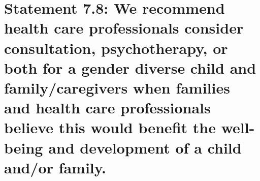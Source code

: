 \documentclass[
]{book}
\begin{document}
\hypertarget{statement-7.8-we-recommend-health-care-professionals-consider-consultation-psychotherapy-or-both-for-a-gender-diverse-child-and-familycaregivers-when-families-and-health-care-professionals-believe-this-would-benefit-the-well-being-and-development-of-a-child-andor-family.}{%
\section*{Statement 7.8: We recommend health care professionals consider consultation, psychotherapy, or both for a gender diverse child and family/caregivers when families and health care professionals believe this would benefit the well-being and development of a child and/or family.}\label{statement-7.8-we-recommend-health-care-professionals-consider-consultation-psychotherapy-or-both-for-a-gender-diverse-child-and-familycaregivers-when-families-and-health-care-professionals-believe-this-would-benefit-the-well-being-and-development-of-a-child-andor-family.}}
\end{document}
